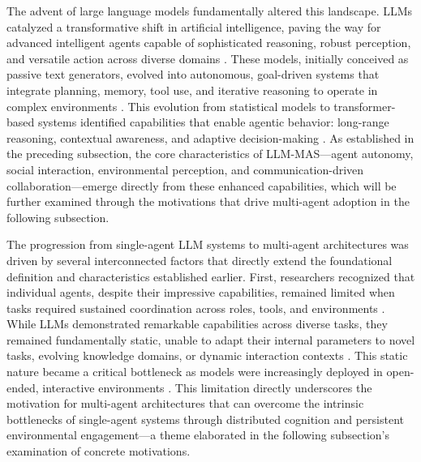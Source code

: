 \documentclass[11pt]{article}
\begin{document}
The advent of large language models fundamentally altered this landscape. LLMs catalyzed a transformative shift in artificial intelligence, paving the way for advanced intelligent agents capable of sophisticated reasoning, robust perception, and versatile action across diverse domains \cite{ref11}. These models, initially conceived as passive text generators, evolved into autonomous, goal-driven systems that integrate planning, memory, tool use, and iterative reasoning to operate in complex environments \cite{ref14}. This evolution from statistical models to transformer-based systems identified capabilities that enable agentic behavior: long-range reasoning, contextual awareness, and adaptive decision-making \cite{ref14}. As established in the preceding subsection, the core characteristics of LLM-MAS---agent autonomy, social interaction, environmental perception, and communication-driven collaboration---emerge directly from these enhanced capabilities, which will be further examined through the motivations that drive multi-agent adoption in the following subsection.

The progression from single-agent LLM systems to multi-agent architectures was driven by several interconnected factors that directly extend the foundational definition and characteristics established earlier. First, researchers recognized that individual agents, despite their impressive capabilities, remained limited when tasks required sustained coordination across roles, tools, and environments \cite{ref2}. While LLMs demonstrated remarkable capabilities across diverse tasks, they remained fundamentally static, unable to adapt their internal parameters to novel tasks, evolving knowledge domains, or dynamic interaction contexts \cite{ref15}. This static nature became a critical bottleneck as models were increasingly deployed in open-ended, interactive environments \cite{ref15}. This limitation directly underscores the motivation for multi-agent architectures that can overcome the intrinsic bottlenecks of single-agent systems through distributed cognition and persistent environmental engagement---a theme elaborated in the following subsection's examination of concrete motivations.
\end{document}

